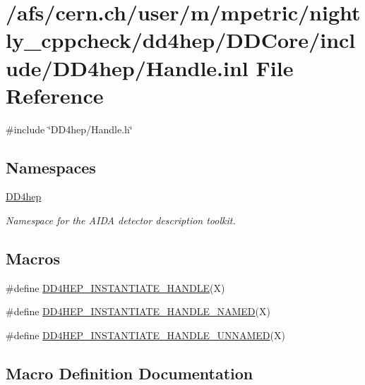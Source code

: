 \hypertarget{_handle_8inl}{}\section{/afs/cern.ch/user/m/mpetric/nightly\+\_\+cppcheck/dd4hep/\+D\+D\+Core/include/\+D\+D4hep/\+Handle.inl File Reference}
\label{_handle_8inl}
{\ttfamily \#include \char`\"{}D\+D4hep/\+Handle.\+h\char`\"{}}\newline
\subsection*{Namespaces}
\begin{DoxyCompactItemize}
\item 
 \hyperlink{namespace_d_d4hep}{D\+D4hep}
\begin{DoxyCompactList}\small\item\em Namespace for the A\+I\+DA detector description toolkit. \end{DoxyCompactList}\end{DoxyCompactItemize}
\subsection*{Macros}
\begin{DoxyCompactItemize}
\item 
\#define \hyperlink{_handle_8inl_ac1a93b92fc9aaa3e60484a966cc20b4f}{D\+D4\+H\+E\+P\+\_\+\+I\+N\+S\+T\+A\+N\+T\+I\+A\+T\+E\+\_\+\+H\+A\+N\+D\+LE}(X)
\item 
\#define \hyperlink{_handle_8inl_a9da33fd2046c253711abd9194ce5265a}{D\+D4\+H\+E\+P\+\_\+\+I\+N\+S\+T\+A\+N\+T\+I\+A\+T\+E\+\_\+\+H\+A\+N\+D\+L\+E\+\_\+\+N\+A\+M\+ED}(X)
\item 
\#define \hyperlink{_handle_8inl_ad861f1cd8d1e45907d1e481780fa99d2}{D\+D4\+H\+E\+P\+\_\+\+I\+N\+S\+T\+A\+N\+T\+I\+A\+T\+E\+\_\+\+H\+A\+N\+D\+L\+E\+\_\+\+U\+N\+N\+A\+M\+ED}(X)
\end{DoxyCompactItemize}


\subsection{Macro Definition Documentation}
\hypertarget{_handle_8inl_ac1a93b92fc9aaa3e60484a966cc20b4f}{}\label{_handle_8inl_ac1a93b92fc9aaa3e60484a966cc20b4f} 
